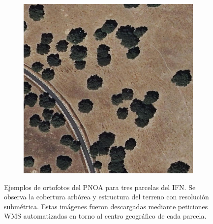 \begin{figure}[H]
\begin{subfigure}[b]{0.31\textwidth}
        \label{fig:orto2}
    \end{subfigure}
    \hfill
    \begin{subfigure}[b]{0.31\textwidth}
        \includegraphics[width=\linewidth]{37_688_2002.0.jpg}
        \label{fig:orto3}
    \end{subfigure}
    
    \caption{\small Ejemplos de ortofotos del PNOA para tres parcelas del IFN. Se observa la cobertura arbórea y estructura del terreno con resolución submétrica. Estas imágenes fueron descargadas mediante peticiones WMS automatizadas en torno al centro geográfico de cada parcela.}
    \label{fig:ortofotos_ejemplo}
\end{figure}
